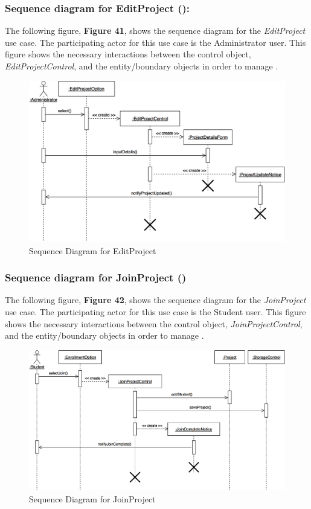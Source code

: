 \documentclass[12pt,letterpaper]{article}
\begin{document}
\subsubsection*{Sequence diagram for EditProject (\editproject{}):}

The following figure, {\bf Figure 41}, shows the sequence diagram for the {\it EditProject} use case. The participating actor for this use case is
the Administrator user. This figure shows the necessary interactions between the control object, {\it EditProjectControl}, and the
entity/boundary objects in order to manage \editproject{}.

\begin{figure}[H]
	\centering{}
	\includegraphics[scale=0.3]{imgs/seq/edit-project.png}
	\caption{Sequence Diagram for EditProject}
\end{figure}

\subsubsection*{Sequence diagram for JoinProject (\joinproject{})}

The following figure, {\bf Figure 42}, shows the sequence diagram for the {\it JoinProject} use case. The participating actor for this use case is
the Student user. This figure shows the necessary interactions between the control object, {\it JoinProjectControl}, and the
entity/boundary objects in order to manage \joinproject{}.

\begin{figure}[H]
	\centering{}
	\includegraphics[scale=0.3]{imgs/seq/join-project.png}
	\caption{Sequence Diagram for JoinProject}
\end{figure}
\end{document}
